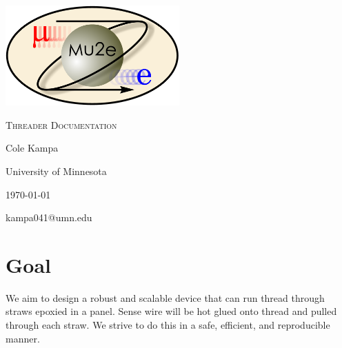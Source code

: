 \documentclass[letterpaper,12pt]{article}
\begin{document}
\begin{titlepage}
	\centering
	\includegraphics[width=0.5\textwidth]{mu2e_logo_oval.png}\par\vspace{2cm}
	{\scshape\LARGE Threader Documentation\par}
	\vspace{3cm}
	{\Large Cole Kampa\par}
	\vspace{3cm}
	{\large University of Minnesota\par}
 	\vspace{.5cm}
	{\large \today \par}
	\vfill
	{kampa041@umn.edu\par}
\end{titlepage}

\setcounter{page}{2}

\tableofcontents
\clearpage

\section{Goal}
We aim to design a robust and scalable device that can run thread through straws epoxied in a panel. Sense wire will be hot glued onto thread and pulled through each straw. We strive to do this in a safe, efficient, and reproducible manner.
\end{document}
